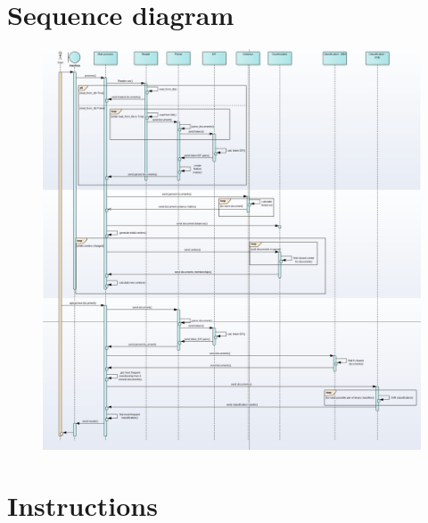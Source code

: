 \chapter{Sequence diagram} \label{appendix-sequence}
\begin{figure}[h]
	\begin{center}
		\includegraphics[width=1.2\linewidth]{images/diagrams/seq-full.png}
		\label{appendix-sequence-diagram}
	\end{center}
\end{figure}


\chapter{Instructions}
